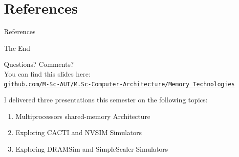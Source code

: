 \documentclass[
	12pt, %
]{beamer}
\begin{document}
\section{References}
\begin{frame}{References}
	
	\hyperlink{start}{}
	
	\nocite{bibitem1}
	\nocite{*}
	 
	
	
\end{frame}



\begin{frame}[plain] %
	\begin{center}
		{\Huge The End}
		
		\bigskip\bigskip %
		
		{\LARGE Questions? Comments?}\\
		You can find this slides here:\\
		\textcolor{blue}{\href{https://github.com/M-Sc-AUT/M.Sc-Computer-Architecture/tree/main/Memory Technologies}{\texttt{github.com/M-Sc-AUT/M.Sc-Computer-Architecture/Memory Technologies}}}
		
		I delivered three presentations this semester on the following topics:
		\begin{enumerate}
			\item Multiprocessors shared-memory Architecture
			\item Exploring CACTI and NVSIM Simulators
			\item Exploring DRAMSim and SimpleScaler Simulators
		\end{enumerate}
	\end{center}
\end{frame}

\end{document}
